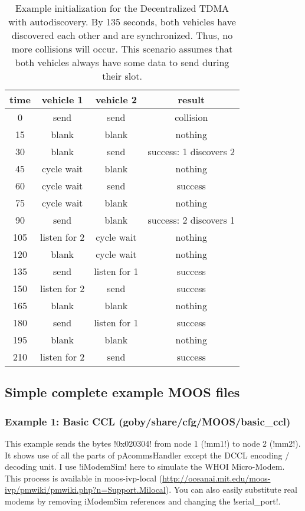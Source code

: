 \begin{table}
\centering
\begin{tabular}{|c|c|c|c|}
\hline time & vehicle 1 & vehicle 2 & result \\ 
\hline 0   & send       & send  & collision \\ 
\hline 15  & blank      & blank & nothing \\ 
\hline 30  & blank      & send  & success: 1 discovers 2 \\ 
\hline 45  & cycle wait & blank & nothing \\ 
\hline 60  & cycle wait & send  & success \\ 
\hline 75  & cycle wait & blank & nothing \\ 
\hline 90  & send       & blank & success: 2 discovers 1 \\ 
\hline 105 & listen for 2 & cycle wait & nothing \\ 
\hline 120 & blank & cycle wait & nothing \\ 
\hline 135 & send & listen for 1 & success \\ 
\hline 150 & listen for 2 & send & success \\ 
\hline 165 & blank & blank & nothing \\ 
\hline 180 & send & listen for 1 & success \\ 
\hline 195 & blank & blank & nothing \\ 
\hline 210 & listen for 2 & send & success \\ 
\hline 
\end{tabular} 
\caption{Example initialization for the Decentralized TDMA with autodiscovery. By 135 seconds, both vehicles have discovered each other and are synchronized. Thus, no more collisions will occur. This scenario assumes that both vehicles always have some data to send during their slot.}
\end{table}

\subsection{Simple complete example MOOS files}

\subsubsection{Example 1: Basic CCL (goby/share/cfg/MOOS/basic\_ccl)}\label{sec:moos_example_1}
This example sends the bytes !0x020304! from node 1 (!mm1!) to node 2 (!mm2!). It shows use of all the parts of pAcommsHandler except the DCCL encoding / decoding unit. I use !iModemSim! here to simulate the WHOI Micro-Modem. This process is available in moos-ivp-local (\url{http://oceanai.mit.edu/moos-ivp/pmwiki/pmwiki.php?n=Support.Milocal}). You can also easily substitute real modems by removing iModemSim references and changing the !serial_port!.

